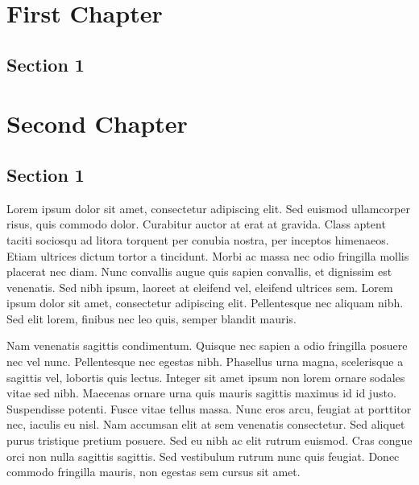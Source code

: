 \documentclass{report}
\begin{document}
	
	\thispagestyle{empty}
	\cleardoublepage
	\tableofcontents
	\chapter{First Chapter}
	\section{Section 1}
	
\chapter{Second Chapter}
\section{Section 1}


Lorem ipsum dolor sit amet, consectetur adipiscing elit. Sed euismod ullamcorper risus, quis commodo dolor. Curabitur auctor at erat at gravida. Class aptent taciti sociosqu ad litora torquent per conubia nostra, per inceptos himenaeos. Etiam ultrices dictum tortor a tincidunt. Morbi ac massa nec odio fringilla mollis placerat nec diam. Nunc convallis augue quis sapien convallis, et dignissim est venenatis. Sed nibh ipsum, laoreet at eleifend vel, eleifend ultrices sem. Lorem ipsum dolor sit amet, consectetur adipiscing elit. Pellentesque nec aliquam nibh. Sed elit lorem, finibus nec leo quis, semper blandit mauris.

Nam venenatis sagittis condimentum. Quisque nec sapien a odio fringilla posuere nec vel nunc. Pellentesque nec egestas nibh. Phasellus urna magna, scelerisque a sagittis vel, lobortis quis lectus. Integer sit amet ipsum non lorem ornare sodales vitae sed nibh. Maecenas ornare urna quis mauris sagittis maximus id id justo. Suspendisse potenti. Fusce vitae tellus massa. Nunc eros arcu, feugiat at porttitor nec, iaculis eu nisl. Nam accumsan elit at sem venenatis consectetur. Sed aliquet purus tristique pretium posuere. Sed eu nibh ac elit rutrum euismod. Cras congue orci non nulla sagittis sagittis. Sed vestibulum rutrum nunc quis feugiat. Donec commodo fringilla mauris, non egestas sem cursus sit amet.
\end{document}

